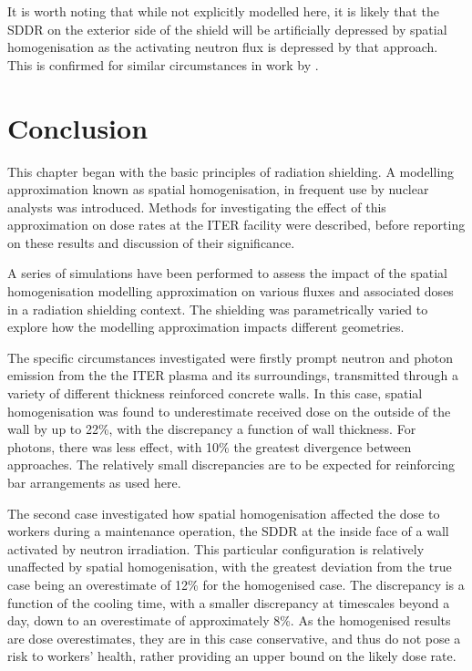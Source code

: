 It is worth noting that while not explicitly modelled here, it is likely that the SDDR on the exterior side of the shield will be artificially depressed by spatial homogenisation as the activating neutron flux is depressed by that approach. This is confirmed for similar circumstances in work by \citeauthor{Sanz2014} \cite{Sanz2014}.


\FloatBarrier
\section{Conclusion}
This chapter began with the basic principles of radiation shielding. A modelling approximation known as spatial homogenisation, in frequent use by nuclear analysts was introduced. Methods for investigating the effect of this approximation on dose rates at the ITER facility were described, before reporting on these results and discussion of their significance.

A series of simulations have been performed to assess the impact of the spatial homogenisation modelling approximation on various fluxes and associated doses in a radiation shielding context. The shielding was parametrically varied to explore how the modelling approximation impacts different geometries.

The specific circumstances investigated were firstly prompt neutron and photon emission from the the ITER plasma and its surroundings, transmitted through a variety of different thickness reinforced concrete walls. In this case, spatial homogenisation was found to underestimate received dose on the outside of the wall by up to 22\%, with the discrepancy a function of wall thickness. For photons, there was less effect, with 10\% the greatest divergence between approaches. The relatively small discrepancies are to be expected for reinforcing bar arrangements as used here. 

The second case investigated how spatial homogenisation affected the dose to workers during a maintenance operation, the SDDR at the inside face of a wall activated by neutron irradiation. This particular configuration is relatively unaffected by spatial homogenisation, with the greatest deviation from the true case being an overestimate of 12\% for the homogenised case. The discrepancy is a function of the cooling time, with a smaller discrepancy at timescales beyond a day, down to an overestimate of approximately 8\%. As the homogenised results are dose overestimates, they are in this case conservative, and thus do not pose a risk to workers' health, rather providing an upper bound on the likely dose rate. 

